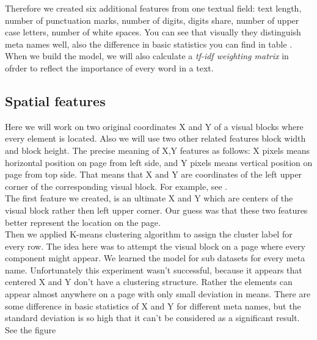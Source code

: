 Therefore we created six additional features from one textual field: text length, number of punctuation marks, number of digits, digits share, number of upper case letters, number of white spaces. You can see that visually they distinguish meta names well, also the difference in basic statistics you can find in table . \\

When we build the model, we will also calculate a \textit{tf-idf weighting matrix} in ofrder to reflect the importance of every word in a text.

\subsection{Spatial features}

Here we will work on two original coordinates X and Y of a visual blocks where every element is located. Also we will use two other related features block width and block height. The precise meaning of X,Y features as follows: X pixels means horizontal position on page from left side, and Y pixels means vertical position on page from top side. That means that X and Y are coordinates of the left upper corner of the corresponding visual block. For example, see .\\

The first feature we created, is an ultimate X and Y which are centers of the visual block rather then left upper corner. Our guess was that these two features better represent the location on the page.\\

Then we applied K-means clustering algorithm to assign the cluster label for every row. The idea here was to attempt the visual block on a page where every component might appear. We learned the model for sub datasets for every meta name. Unfortunately this experiment wasn't successful, because it appears that centered X and Y don't have a clustering structure. Rather the elements can appear almost anywhere on a page with only small deviation in means. There are some difference in basic statistics of X and Y for different meta names, but the standard deviation is so high that it can't be considered as a significant result. See the figure   \\

